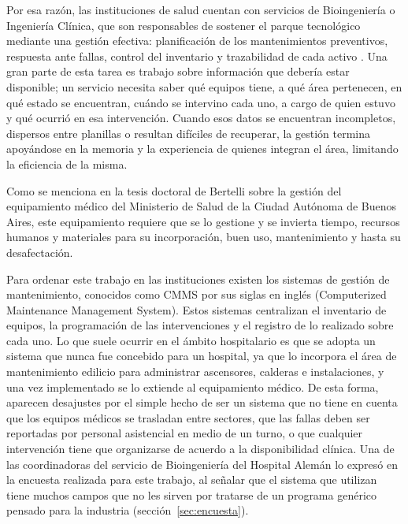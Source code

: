 \documentclass[10pt]{article}
\begin{document}
Por esa razón, las instituciones de salud cuentan con servicios de Bioingeniería o Ingeniería Clínica, que son responsables de sostener el parque tecnológico mediante una gestión efectiva: planificación de los mantenimientos preventivos, respuesta ante fallas, control del inventario y trazabilidad de cada activo \cite{cardoso_waqued}. Una gran parte de esta tarea es trabajo sobre información que debería estar disponible; un servicio necesita saber qué equipos tiene, a qué área pertenecen, en qué estado se encuentran, cuándo se intervino cada uno, a cargo de quien estuvo y qué ocurrió en esa intervención. Cuando esos datos se encuentran incompletos, dispersos entre planillas o resultan difíciles de recuperar, la gestión termina apoyándose en la memoria y la experiencia de quienes integran el área, limitando la eficiencia de la misma.

Como se menciona en la tesis doctoral de Bertelli \cite{bertelli2023} sobre la gestión del equipamiento médico del Ministerio de Salud de la Ciudad Autónoma de Buenos Aires, este equipamiento requiere que se lo gestione y se invierta tiempo, recursos humanos y materiales para su incorporación, buen uso, mantenimiento y hasta su desafectación. 

Para ordenar este trabajo en las instituciones existen los sistemas de gestión de mantenimiento, conocidos como CMMS por sus siglas en inglés (Computerized Maintenance Management System). Estos sistemas centralizan el inventario de equipos, la programación de las intervenciones y el registro de lo realizado sobre cada uno. Lo que suele ocurrir en el ámbito hospitalario es que se adopta un sistema que nunca fue concebido para un hospital, ya que lo incorpora el área de mantenimiento edilicio para administrar ascensores, calderas e instalaciones, y una vez implementado se lo extiende al equipamiento médico. De esta forma, aparecen desajustes por el simple hecho de ser un sistema que no tiene en cuenta que los equipos médicos se trasladan entre sectores, que las fallas deben ser reportadas por personal asistencial en medio de un turno, o que cualquier intervención tiene que organizarse de acuerdo a la disponibilidad clínica. Una de las coordinadoras del servicio de Bioingeniería del Hospital Alemán lo expresó en la encuesta realizada para este trabajo, al señalar que el sistema que utilizan tiene muchos campos que no les sirven por tratarse de un programa genérico pensado para la industria (sección~\ref{sec:encuesta}).
\end{document}
